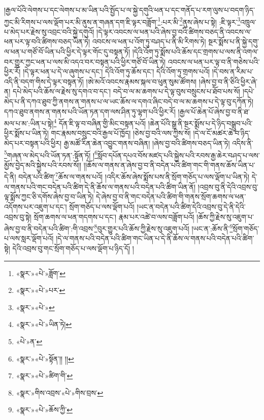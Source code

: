 །རྒྱལ་པོའི་ལེགས་པ་དང་ལེགས་པ་མ་ཡིན་པའི་སྤྱོད་པ་ལ་སྐྱེ་དགུའི་ཕན་པ་དང་གནོད་པ་རག་ལུས་པ་བདག་ཉིད་ཀྱང་མི་རིགས་པ་ལས་ལྡོག་པར་མི་ནུས་ན་གཞན་དག་ཇི་ལྟར་བཟློག་\footnote{«སྣར་»«པེ་»ཟློག་}:པར་མི་\footnote{«སྣར་»«པེ་»པར་}ནུས་ཞེས་པ་སྟེ། :ཇི་ལྟར་\footnote{«སྣར་»«པེ་»}འཁྲུལ་པ་མེད་པར་རྗེས་སུ་འབྲང་བའི་སྐྱེ་དགུའོ། །དེ་ལྟར་འབངས་ལ་ཕན་པའི་ཞེས་བྱ་བའི་ཚིགས་བཅད་ནི་འབངས་ལ་ཕན་པར་ལྟ་བའི་ཚིགས་བཅད་ཡིན་ཏེ། འབངས་ལ་ཕན་པ་འོག་ཏུ་བཤད་པ་ནི་མི་རིགས་ཏེ། སྔར་སྨོས་པ་ནི་སྐྱེ་དགུ་ལ་ཕན་པ་གཙོ་བོ་ཡིན་པའི་ཕྱིར་དེ་ལྟར་གོང་དུ་བསྟན་ཏོ། །དེའི་འོག་ཏུ་སྨོས་པའི་ཆོས་དང་གྲགས་པ་ལས་ནི་འགལ་བར་གྱུར་ཀྱང་ཕན་པ་ལས་མི་འདའ་བར་བསྟན་པའི་ཕྱིར་གཙོ་བོ་ཡིན་ཏེ། འབངས་ལ་ཕན་པར་ལྟ་བ་ནི་གཅེས་པའི་ཕྱིར་རོ། །དེ་ལྟར་ཕན་པ་དེ་ལ་ཞུགས་པ་དང་། དེའི་འོག་ཏུ་ཆོས་དང་། དེའི་འོག་ཏུ་གྲགས་པའོ། །དེ་བས་ན་རིམ་པ་འདི་ནི་བདག་གིས་དེ་ལྟར་བསྟན་ཏོ། །ཨེ་མའོ་འབངས་རྣམས་སྐལ་བ་ཕུན་སུམ་ཚོགས། །ཞེས་བྱ་བ་ནི་ཅིའི་ཕྱིར་ཞེ་ན། དཔེ་མེད་པའི་ཆོས་ལ་རྗེས་སུ་དགའ་བ་དང་། བདེ་བ་ལ་མ་ཆགས་པ་དེ་ལྟ་བུས་བསྲུངས་པ་ཐོབ་པས་སོ། །དཔེ་མེད་པ་ནི་དཀའ་ཐུབ་ཀྱི་ནགས་ན་གནས་པ་ལ་ཡང་ཆོས་ལ་དགའ་ཞིང་བདེ་བ་ལ་མ་ཆགས་པ་དེ་ལྟ་བུ་དཀོན་ཏེ། དཀའ་ཐུབ་ནགས་ན་གནས་པའི་ཡོན་ཏན་དག་ལས་ཤིན་ཏུ་ལྷག་པའི་ཕྱིར་རོ། །རྒྱལ་པོ་ཆེན་པོ་ཞེས་བྱ་བ་ནི་ཐ་མལ་པ་མ་:ཡིན་པ་སྟེ།\footnote{«སྣར་»«པེ་»ཡིན་ཏེ།} དོན་ཇི་ལྟ་བ་བཞིན་གྱི་མིང་བསྟན་པའོ། །ཆེན་པོའི་སྒྲ་ནི་སྔར་སྨོས་པ་དེ་ཉིད་བསྒྲུབ་པའི་ཕྱིར་སྨོས་པ་ཡིན་ཏེ། གང་རྣམས་བསྲུང་བའི་རྒྱལ་པོ་ཁྱོད། །ཅེས་བྱ་བའི་ལས་ཀྱིས་སོ། །དེ་ལ་ངོ་མཚར་ཆེ་བ་ཉིད་མེད་པར་བསྟན་པའི་ཕྱིར། རྒྱ་མཚོ་རིན་ཆེན་འབྱུང་གནས་བཞིན། །ཞེས་བྱ་བའི་ཚིགས་བཅད་ཡིན་ཏེ། འདིས་ནི་\footnote{«པེ་»ན་}གཞན་ལ་མེད་པའི་ཡོན་ཏན་:སྟོན་ཏོ། །\footnote{«སྣར་»«པེ་»སྟོན་།། །།}སློབ་དཔོན་དཔའ་བོས་མཛད་པའི་སྐྱེས་པའི་རབས་རྒྱ་ཆེར་བཤད་པ་ལས་མྱོས་བྱེད་མའི་སྐྱེས་པའི་རབས་སོ།། །།ཆོས་ལ་གནས་ན་ཞེས་བྱ་བ་ནི་བདེན་པའི་ཚིག་གང་གི་གནས་ཆོས་ཡིན་པ་དེ་ནི། བདེན་པའི་ཚིག་\footnote{«སྣར་»«པེ་»ཚིག་གི་}ཆོས་ལ་གནས་པའོ། །འདིར་ཆོས་ཞེས་སྨོས་པས་ནི་སྲོག་གཅོད་པ་ལས་ལྡོག་པ་ཡིན་ཏེ། དེ་ལ་གནས་པའི་གང་བདེན་པའི་ཚིག་དེ་ནི་ཆོས་ལ་གནས་པའི་བདེན་པའི་ཚིག་ཡིན་ནོ། །འབྲས་བུ་ནི་དེའི་འབྲས་བུ་ལྟ་སྨོས་ཀྱང་ཅི་དགོས་ཞེས་བྱ་བ་ཡིན་ཏེ། དེ་ཞེས་བྱ་བ་ནི་གང་བདེན་པའི་ཚིག་གི་གནས་སྲོག་ཆགས་ལ་ཕན་འདོགས་པར་འཇུག་པ་དང་། སྲོག་གཅོད་པ་ལས་ལྡོག་པའོ། །ཡང་ན་བདེན་པའི་ཚིག་དེའི་འབྲས་བུ་དེ་ནི་དེའི་འབྲས་བུ་སྟེ། སྲོག་ཆགས་ལ་ཕན་གདགས་པ་དང་། རྣམ་པར་འཚེ་བ་ལས་བཟློག་པའོ། །ཆོས་ཀྱི་རྗེས་སུ་འཇུག་པ་ཞེས་བྱ་བ་ནི་བདེན་པའི་ཚིག་:གི་འབྲས་\footnote{«སྣར་»གིས་འབྲས་«པེ་»གིས་བྲས་}བུར་གྱུར་པའི་ཆོས་ཀྱི་རྗེས་སུ་འཇུག་པའོ། །ཡང་ན་:ཆོས་ནི་\footnote{«སྣར་»«པེ་»ཆོས་ཀྱི་}སྲོག་གཅོད་པ་ལས་སླར་ལྡོག་པའོ། །དེ་ལ་གནས་པའི་བདེན་པའི་ཚིག་གང་ཡིན་པ་དེ་ནི་ཆོས་ལ་གནས་པའི་བདེན་པའི་ཚིག་སྟེ། དེའི་འབྲས་བུ་གང་སྲོག་གཅོད་པ་ལས་ལྡོག་པ་ཉིད་དོ། །
